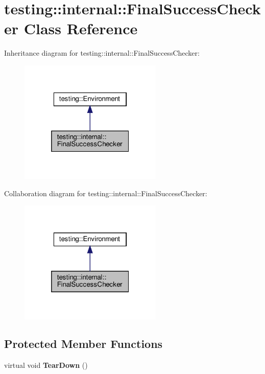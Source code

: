 \hypertarget{classtesting_1_1internal_1_1_final_success_checker}{}\section{testing\+:\+:internal\+:\+:Final\+Success\+Checker Class Reference}
\label{classtesting_1_1internal_1_1_final_success_checker}


Inheritance diagram for testing\+:\+:internal\+:\+:Final\+Success\+Checker\+:
\nopagebreak
\begin{figure}[H]
\begin{center}
\leavevmode
\includegraphics[width=193pt]{classtesting_1_1internal_1_1_final_success_checker__inherit__graph}
\end{center}
\end{figure}


Collaboration diagram for testing\+:\+:internal\+:\+:Final\+Success\+Checker\+:
\nopagebreak
\begin{figure}[H]
\begin{center}
\leavevmode
\includegraphics[width=193pt]{classtesting_1_1internal_1_1_final_success_checker__coll__graph}
\end{center}
\end{figure}
\subsection*{Protected Member Functions}
\begin{DoxyCompactItemize}
\item 
\mbox{\label{classtesting_1_1internal_1_1_final_success_checker_a8f39d12a1f2bfe8c6c04b5c6749382c9}} 
virtual void {\bfseries Tear\+Down} ()
\end{DoxyCompactItemize}
